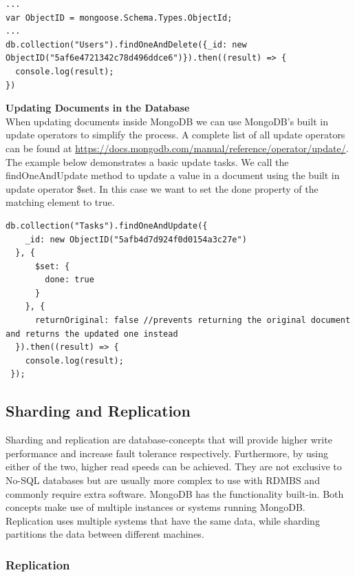 \documentclass[11pt]{article}
\begin{document}
\begin{lstlisting}
...
var ObjectID = mongoose.Schema.Types.ObjectId;
...
db.collection("Users").findOneAndDelete({_id: new ObjectID("5af6e4721342c78d496ddce6")}).then((result) => {
  console.log(result);
})
\end{lstlisting}  

\noindent
\textbf{Updating Documents in the Database} \\  

When updating documents inside MongoDB we can use MongoDB's built in update operators to simplify the process. A complete list of all update operators can be found at \url{https://docs.mongodb.com/manual/reference/operator/update/}. The example below demonstrates a basic update tasks. We call the findOneAndUpdate method to update a value in a document using the built in update operator \$set. In this case we want to set the done property of the matching element to true. 

\begin{lstlisting}
db.collection("Tasks").findOneAndUpdate({
    _id: new ObjectID("5afb4d7d924f0d0154a3c27e")
  }, {
      $set: {
        done: true
      }
    }, {
      returnOriginal: false //prevents returning the original document and returns the updated one instead
  }).then((result) => {
    console.log(result);
 });
\end{lstlisting}
 

\subsection{Sharding and Replication}
Sharding and replication are database-concepts that will provide higher write performance and increase fault tolerance respectively. Furthermore, by using either of the two, higher read speeds can be achieved. 
They are not exclusive to No-SQL databases but are usually more complex to use with RDMBS and commonly require extra software. 
MongoDB has the functionality built-in. Both concepts make use of multiple instances or systems running MongoDB. 
Replication uses multiple systems that have the same data, while sharding partitions the data between different machines. 
\subsubsection{Replication}
\end{document}
